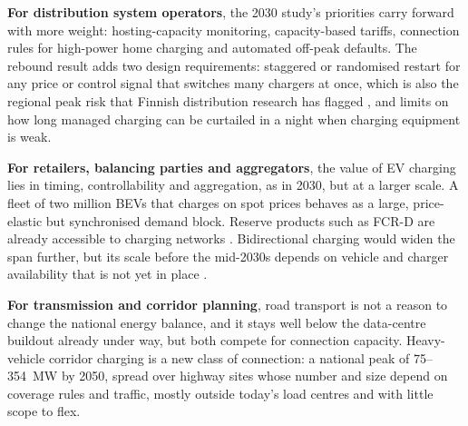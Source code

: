 \documentclass[11pt,a4paper]{article}
\begin{document}
\textbf{For distribution system operators}, the 2030 study's priorities carry forward with more weight: hosting-capacity monitoring, capacity-based tariffs, connection rules for high-power home charging and automated off-peak defaults. The rebound result adds two design requirements: staggered or randomised restart for any price or control signal that switches many chargers at once, which is also the regional peak risk that Finnish distribution research has flagged \citep{lut2026charging}, and limits on how long managed charging can be curtailed in a night when charging equipment is weak.

\textbf{For retailers, balancing parties and aggregators}, the value of EV charging lies in timing, controllability and aggregation, as in 2030, but at a larger scale. A fleet of two million BEVs that charges on spot prices behaves as a large, price-elastic but synchronised demand block. Reserve products such as FCR-D are already accessible to charging networks \citep{virta2026fcrd}. Bidirectional charging would widen the span further, but its scale before the mid-2030s depends on vehicle and charger availability that is not yet in place \citep{vattenfall2026v2g,ey2025flex}.

\textbf{For transmission and corridor planning}, road transport is not a reason to change the national energy balance, and it stays well below the data-centre buildout already under way, but both compete for connection capacity. Heavy-vehicle corridor charging is a new class of connection: a national peak of 75--354~MW by 2050, spread over highway sites whose number and size depend on coverage rules and traffic, mostly outside today's load centres and with little scope to flex.

\end{document}
